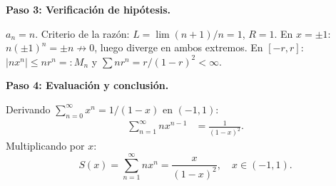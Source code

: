 \begin{example}
\begin{myproof}
\textbf{Paso 3: Verificación de hipótesis.}

$a_n = n$. Criterio de la razón:
$L = \lim (n+1)/n = 1$, $R = 1$.
En $x=\pm 1$: $n(\pm1)^n = \pm n \not\to 0$, luego diverge en
ambos extremos. En $[-r,r]$: $|nx^n| \leq nr^n =: M_n$ y
$\sum nr^n = r/(1-r)^2 < \infty$.

\textbf{Paso 4: Evaluación y conclusión.}

Derivando $\sum_{n=0}^\infty x^n = 1/(1-x)$ en $(-1,1)$:
\begin{align*}
    \sum_{n=1}^\infty nx^{n-1} &= \frac{1}{(1-x)^2}.
\end{align*}
Multiplicando por $x$:
\[
    \boxed{S(x) = \sum_{n=1}^\infty nx^n
        = \frac{x}{(1-x)^2}, \quad x \in (-1,1).}
\]
\end{myproof}
\end{example}

